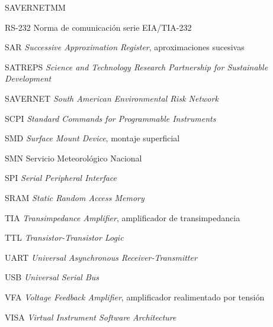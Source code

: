 \begin{listasimbolos}{SAVERNETMM}
\item[RS-232] Norma de comunicación serie EIA/TIA-232
\item[SAR] \emph{Successive Approximation Register}, aproximaciones sucesivas
\item[SATREPS] \emph{Science and Technology Research Partnership for Sustainable Development}
\item[SAVERNET] \emph{South American Environmental Risk Network}
\item[SCPI] \emph{Standard Commands for Programmable Instruments}
\item[SMD] \emph{Surface Mount Device}, montaje superficial
\item[SMN] Servicio Meteorológico Nacional
\item[SPI] \emph{Serial Peripheral Interface}
\item[SRAM] \emph{Static Random Access Memory}
\item[TIA] \emph{Transimpedance Amplifier}, amplificador de transimpedancia
\item[TTL] \emph{Transistor-Transistor Logic}
\item[UART] \emph{Universal Asynchronous Receiver-Transmitter}
\item[USB] \emph{Universal Serial Bus}
\item[VFA] \emph{Voltage Feedback Amplifier}, amplificador realimentado por tensión
\item[VISA] \emph{Virtual Instrument Software Architecture}
\end{listasimbolos}

\cleardoublepage
